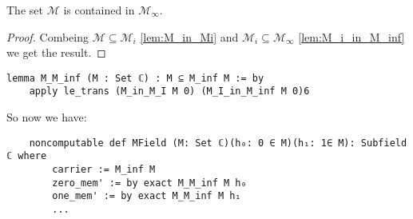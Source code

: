 \begin{lemma}
    The set $\mathcal{M}$ is contained in $\mathcal{M}_{\infty}$.
\end{lemma}

\begin{proof}
    Combeing $\mathcal{M} \subseteq \mathcal{M}_i$ \ref{lem:M_in_Mi} and $\mathcal{M}_i \subseteq \mathcal{M}_{\infty}$ \ref{lem:M_i_in_M_inf} we get the result.
\end{proof}

\begin{lstlisting}
lemma M_M_inf (M : Set ℂ) : M ⊆ M_inf M := by 
    apply le_trans (M_in_M_I M 0) (M_I_in_M_inf M 0)6
\end{lstlisting}

So now we have:
\begin{lstlisting}
    noncomputable def MField (M: Set ℂ)(h₀: 0 ∈ M)(h₁: 1∈ M): Subfield ℂ where
        carrier := M_inf M
        zero_mem' := by exact M_M_inf M h₀
        one_mem' := by exact M_M_inf M h₁
        ...
\end{lstlisting}